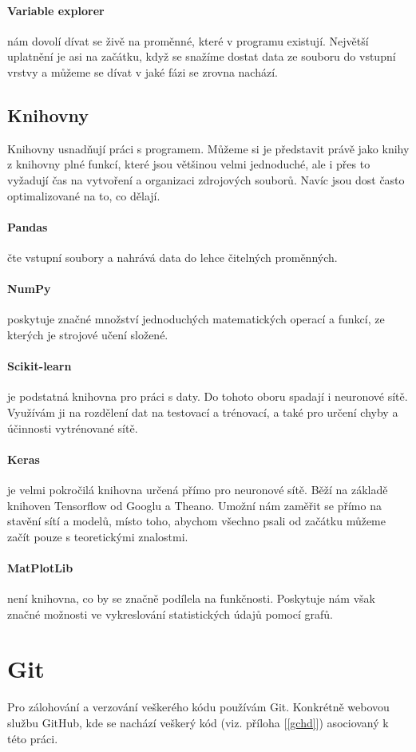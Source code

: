 \documentclass[12pt,a4paper]{report}
\begin{document}
		\paragraph{Variable explorer}
		nám dovolí dívat se živě na proměnné, které v programu existují. Největší uplatnění je asi na začátku, když se snažíme dostat data ze souboru do vstupní vrstvy a můžeme se dívat v jaké fázi se zrovna nachází.
		\subsection{Knihovny}
		Knihovny usnadňují práci s programem. Můžeme si je představit právě jako knihy z knihovny plné funkcí, které jsou většinou velmi jednoduché, ale i přes to vyžadují čas na vytvoření a organizaci zdrojových souborů. Navíc jsou dost často optimalizované na to, co dělají.
			\paragraph{Pandas}
			čte vstupní soubory a nahrává data do lehce čitelných proměnných.
			\paragraph{NumPy}
			poskytuje značné množství jednoduchých matematických operací a funkcí, ze kterých je strojové učení složené.
			\paragraph{Scikit-learn}
			je podstatná knihovna pro práci s daty. Do tohoto oboru spadají i neuronové sítě. Využívám ji na rozdělení dat na testovací a trénovací, a také pro určení chyby a účinnosti vytrénované sítě.
			\paragraph{Keras}
			je velmi pokročilá knihovna určená přímo pro neuronové sítě. Běží na základě knihoven Tensorflow od Googlu a Theano. Umožní nám zaměřit se přímo na stavění sítí a modelů, místo toho, abychom všechno psali od začátku můžeme začít pouze s teoretickými znalostmi.
			\paragraph{MatPlotLib}
			není knihovna, co by se značně podílela na funkčnosti. Poskytuje nám však značné možnosti ve vykreslování statistických údajů pomocí grafů.
	\section{Git}
		Pro zálohování a verzování veškerého kódu používám Git. Konkrétně webovou službu GitHub, kde se nachází veškerý kód (viz. příloha [\ref{gchd}]) asociovaný k této práci.
		
\end{document}

